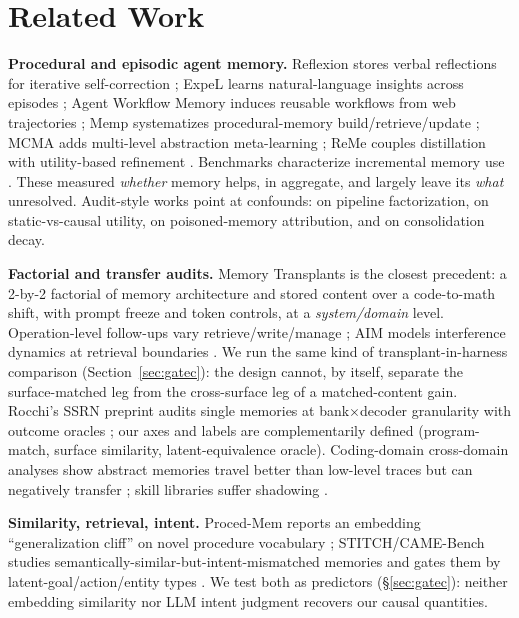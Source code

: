 \section{Related Work}

\textbf{Procedural and episodic agent memory.}
Reflexion stores verbal reflections for iterative self-correction \citep{shinn2023reflexion}; ExpeL learns natural-language insights across episodes \citep{zhao2024expel}; Agent Workflow Memory induces reusable workflows from web trajectories \citep{wang2025awm}; Memp systematizes procedural-memory build/retrieve/update \citep{fang2025memp}; MCMA adds multi-level abstraction meta-learning \citep{mcma2026}; ReMe couples distillation with utility-based refinement \citep{reme2026}. Benchmarks characterize incremental memory use \citep{memagentbench2025,lifelong2025,after2026,mem2act2026}. These measured \emph{whether} memory helps, in aggregate, and largely leave its \emph{what} unresolved. Audit-style works point at confounds: \citet{memdelta2026} on pipeline factorization, \citet{bridge2026} on static-vs-causal utility, \citet{memaudit2026} on poisoned-memory attribution, and \citet{faultymem2026} on consolidation decay.

\textbf{Factorial and transfer audits.}
Memory Transplants \citep{feng2026transplants} is the closest precedent: a 2-by-2 factorial of memory architecture and stored content over a code-to-math shift, with prompt freeze and token controls, at a \emph{system/domain} level. Operation-level follow-ups vary retrieve/write/manage \citep{feng2026operations}; AIM models interference dynamics at retrieval boundaries \citep{aim2026collide}. We run the same kind of transplant-in-harness comparison (Section~\ref{sec:gatec}): the design cannot, by itself, separate the surface-matched leg from the cross-surface leg of a matched-content gain. Rocchi's SSRN preprint audits single memories at bank$\times$decoder granularity with outcome oracles \citep{rocchi2026credit}; our axes and labels are complementarily defined (program-match, surface similarity, latent-equivalence oracle). Coding-domain cross-domain analyses show abstract memories travel better than low-level traces but can negatively transfer \citep{memtransfer2026}; skill libraries suffer shadowing \citep{moreskills2026}.

\textbf{Similarity, retrieval, intent.}
Proced-Mem reports an embedding ``generalization cliff'' on novel procedure vocabulary \citep{procedmem2025}; STITCH/CAME-Bench studies semantically-similar-but-intent-mismatched memories and gates them by latent-goal/action/entity types \citep{stitch2026camebench}. We test both as predictors (\S\ref{sec:gatec}): neither embedding similarity nor LLM intent judgment recovers our causal quantities.

